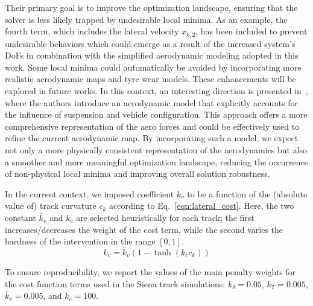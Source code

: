 Their primary goal is to improve the optimization landscape, ensuring that the solver is less likely trapped by undesirable local minima. As an example, the fourth term, which includes the lateral velocity $x_{k,2}$, has been included to prevent undesirable behaviors which could emerge as a result of the increased system's DoFs in combination with the simplified aerodynamic modeling adopted in this work. Some local minima could automatically be avoided by incorporating more realistic aerodynamic maps and tyre wear models. These enhancements will be explored in future works. In this context, an interesting direction is presented in~\cite{Masouleh:IEEE:2016}, where the authors introduce an aerodynamic model that explicitly accounts for the influence of suspension and vehicle configuration. This approach offers a more comprehensive representation of the aero forces and could be effectively used to refine the current aerodynamic map. By incorporating such a model, we expect not only a more physically consistent representation of the aerodynamics but also a smoother and more meaningful optimization landscape, reducing the occurrence of non-physical local minima and improving overall solution robustness.%

In the current context, we imposed coefficient $k_v$ to be a function of the (absolute value of) track curvature $c_k$ according to Eq.~\eqref{eqn:lateral_cost}. Here, the two constant $\bar{k}_v$ and $k_c$ are selected heuristically for each track; the first increases/decreases the weight of the cost term, while the second varies the hardness of the intervention in the range $[0,1]$.
\begin{equation}\label{eqn:lateral_cost}
	k_v = \bar{k}_v(1-\tanh(k_c c_k))
\end{equation}

To ensure reproducibility, we report the values of the main penalty weights for the cost function terms used in the Siena track simulations: $k_{\delta} = 0.05$, $k_T = 0.005$, $\bar{k}_v = 0.005$, and $k_c = 100$. 

